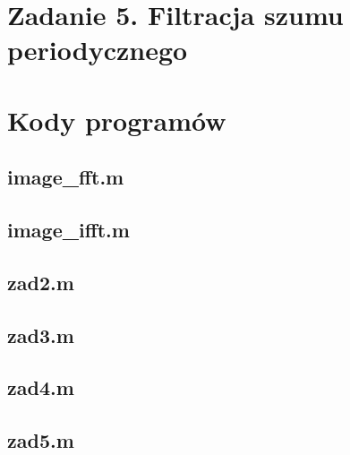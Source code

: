 





 



\section*{Zadanie 5. Filtracja szumu periodycznego}







\newpage \section*{Kody programów}

\subsection*{image\_fft.m     }
\subsection*{image\_ifft.m    } \newpage
\subsection*{zad2.m           } \newpage
\subsection*{zad3.m           } \newpage
\subsection*{zad4.m           } \newpage
\subsection*{zad5.m           } \newpage









